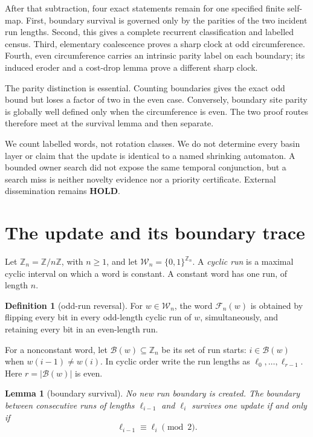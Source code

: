 \documentclass[11pt,a4paper]{amsart}
\newtheorem{lemma}[theorem]{Lemma}
\theoremstyle{definition}
\newtheorem{definition}[theorem]{Definition}
\theoremstyle{remark}
\newcommand{\F}{\mathcal F}
\newcommand{\B}{\mathcal B}
\begin{document}
After that subtraction, four exact statements remain for one specified
finite self-map.  First, boundary survival is governed only by the parities
of the two incident run lengths.  Second, this gives a complete recurrent
classification and labelled census.  Third, elementary coalescence proves a
sharp clock at odd circumference.  Fourth, even circumference carries an
intrinsic parity label on each boundary; its induced eroder and a cost-drop
lemma prove a different sharp clock.

The parity distinction is essential.  Counting boundaries gives the exact
odd bound but loses a factor of two in the even case.  Conversely, boundary
site parity is globally well defined only when the circumference is even.
The two proof routes therefore meet at the survival lemma and then separate.

We count labelled words, not rotation classes.  We do not determine every
basin layer or claim that the update is identical to a named shrinking
automaton.  A bounded owner search did not expose the same temporal
conjunction, but a search miss is neither novelty evidence nor a priority
certificate.  External dissemination remains \textbf{HOLD}.

\section{The update and its boundary trace}

Let \(\mathbb Z_n=\mathbb Z/n\mathbb Z\), with \(n\ge1\), and let
\(\mathcal W_n=\{0,1\}^{\mathbb Z_n}\).  A \emph{cyclic run} is a maximal
cyclic interval on which a word is constant.  A constant word has one run,
of length \(n\).

\begin{definition}[odd-run reversal]\label{def:update}
For \(w\in\mathcal W_n\), the word \(\F_n(w)\) is obtained by flipping every
bit in every odd-length cyclic run of \(w\), simultaneously, and retaining
every bit in an even-length run.
\end{definition}

For a nonconstant word, let \(\B(w)\subseteq\mathbb Z_n\) be its set of run
starts: \(i\in\B(w)\) when \(w(i-1)\ne w(i)\).  In cyclic order write the
run lengths as \(\ell_0,\ldots,\ell_{r-1}\).  Here \(r=|\B(w)|\) is even.

\begin{lemma}[boundary survival]\label{lem:survival}
No new run boundary is created.  The boundary between consecutive runs of
lengths \(\ell_{i-1}\) and \(\ell_i\) survives one update if and only if
\[
                    \ell_{i-1}\equiv\ell_i\pmod2.
\]
\end{lemma}
\end{document}
